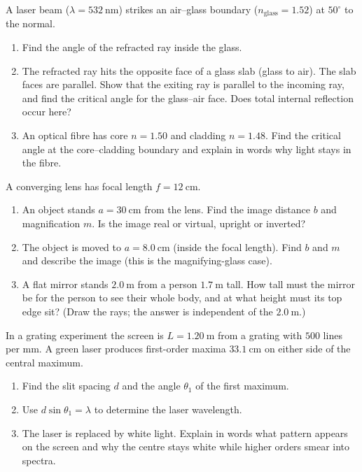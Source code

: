 \begin{exercise}\label{ex:em-12}
A laser beam ($\lambda = 532\ \mathrm{nm}$) strikes an air--glass boundary ($n_\text{glass} = 1.52$) at $50^\circ$ to the normal.
\begin{enumerate}[label=(\alph*)]
  \item Find the angle of the refracted ray inside the glass.
  \item The refracted ray hits the opposite face of a glass slab (glass to air). The slab faces are parallel. Show that the exiting ray is parallel to the incoming ray, and find the critical angle for the glass--air face. Does total internal reflection occur here?
  \item An optical fibre has core $n = 1.50$ and cladding $n = 1.48$. Find the critical angle at the core--cladding boundary and explain in words why light stays in the fibre.
\end{enumerate}
\end{exercise}

\begin{exercise}\label{ex:em-13}
A converging lens has focal length $f = 12\ \mathrm{cm}$.
\begin{enumerate}[label=(\alph*)]
  \item An object stands $a = 30\ \mathrm{cm}$ from the lens. Find the image distance $b$ and magnification $m$. Is the image real or virtual, upright or inverted?
  \item The object is moved to $a = 8.0\ \mathrm{cm}$ (inside the focal length). Find $b$ and $m$ and describe the image (this is the magnifying-glass case).
  \item A flat mirror stands $2.0\ \mathrm{m}$ from a person $1.7\ \mathrm{m}$ tall. How tall must the mirror be for the person to see their whole body, and at what height must its top edge sit? (Draw the rays; the answer is independent of the $2.0\ \mathrm{m}$.)
\end{enumerate}
\end{exercise}

\begin{exercise}\label{ex:em-14}
In a grating experiment the screen is $L = 1.20\ \mathrm{m}$ from a grating with $500$ lines per mm. A green laser produces first-order maxima $33.1\ \mathrm{cm}$ on either side of the central maximum.
\begin{enumerate}[label=(\alph*)]
  \item Find the slit spacing $d$ and the angle $\theta_1$ of the first maximum.
  \item Use $d\sin\theta_1 = \lambda$ to determine the laser wavelength.
  \item The laser is replaced by white light. Explain in words what pattern appears on the screen and why the centre stays white while higher orders smear into spectra.
\end{enumerate}
\end{exercise}

